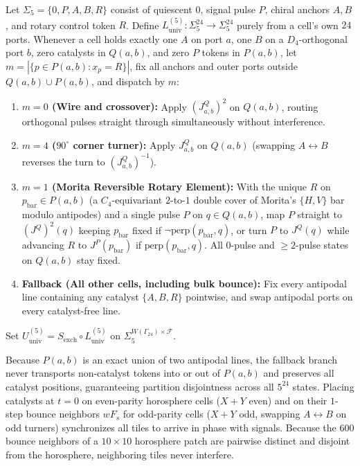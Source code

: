 \begin{definition}
\label{def:u-univ5}
Let $\Sigma_5 = \{0, P, A, B, R\}$ consist of quiescent $0$, signal pulse $P$, chiral anchors $A, B$, and rotary control token $R$. Define $L_{\mathrm{univ}}^{(5)} : \Sigma_5^{24} \to \Sigma_5^{24}$ purely from a cell's own $24$ ports. Whenever a cell holds exactly one $A$ on port $a$, one $B$ on a $D_4$-orthogonal port $b$, zero catalysts in $Q(a,b)$, and zero $P$ tokens in $P(a,b)$, let $m = |\{p \in P(a,b) : x_p = R\}|$, fix all anchors and outer ports outside $Q(a,b) \cup P(a,b)$, and dispatch by $m$:
\begin{enumerate}
\item \textbf{$m = 0$ (Wire and crossover):} Apply $(J^Q_{a,b})^2$ on $Q(a,b)$, routing orthogonal pulses straight through simultaneously without interference.
\item \textbf{$m = 4$ ($90^\circ$ corner turner):} Apply $J^Q_{a,b}$ on $Q(a,b)$ (swapping $A \leftrightarrow B$ reverses the turn to $(J^Q_{a,b})^{-1}$).
\item \textbf{$m = 1$ (Morita Reversible Rotary Element):} With the unique $R$ on $p_{\mathrm{bar}} \in P(a,b)$ (a $C_4$-equivariant $2$-to-$1$ double cover of Morita's $\{H,V\}$ bar modulo antipodes) and a single pulse $P$ on $q \in Q(a,b)$, map $P$ straight to $(J^Q)^2(q)$ keeping $p_{\mathrm{bar}}$ fixed if $\neg\mathrm{perp}(p_{\mathrm{bar}}, q)$, or turn $P$ to $J^Q(q)$ while advancing $R$ to $J^P(p_{\mathrm{bar}})$ if $\mathrm{perp}(p_{\mathrm{bar}}, q)$. All $0$-pulse and $\ge 2$-pulse states on $Q(a,b)$ stay fixed.
\item \textbf{Fallback (All other cells, including bulk bounce):} Fix every antipodal line containing any catalyst $\{A,B,R\}$ pointwise, and swap antipodal ports on every catalyst-free line.
\end{enumerate}
Set $U_{\mathrm{univ}}^{(5)} = S_{\mathrm{exch}} \circ L_{\mathrm{univ}}^{(5)}$ on $\Sigma_5^{W(\Gamma_{24}) \times \mathcal{F}}$.
\end{definition}

Because $P(a,b)$ is an exact union of two antipodal lines, the fallback branch never transports non-catalyst tokens into or out of $P(a,b)$ and preserves all catalyst positions, guaranteeing partition disjointness across all $5^{24}$ states. Placing catalysts at $t = 0$ on even-parity horosphere cells ($X+Y$ even) and on their $1$-step bounce neighbors $w F_s$ for odd-parity cells ($X+Y$ odd, swapping $A \leftrightarrow B$ on odd turners) synchronizes all tiles to arrive in phase with signals. Because the $600$ bounce neighbors of a $10 \times 10$ horosphere patch are pairwise distinct and disjoint from the horosphere, neighboring tiles never interfere.

